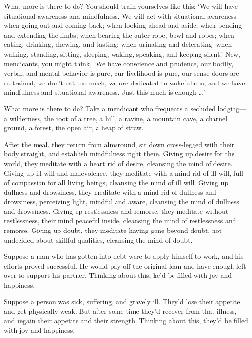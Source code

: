 \documentclass[12pt,openany]{book}%
\begin{document}
What more is there to do? You should train yourselves like this: ‘We will have situational awareness and mindfulness. We will act with situational awareness when going out and coming back; when looking ahead and aside; when bending and extending the limbs; when bearing the outer robe, bowl and robes; when eating, drinking, chewing, and tasting; when urinating and defecating; when walking, standing, sitting, sleeping, waking, speaking, and keeping silent.’ Now, mendicants, you might think, ‘We have conscience and prudence, our bodily, verbal, and mental behavior is pure, our livelihood is pure, our sense doors are restrained, we don’t eat too much, we are dedicated to wakefulness, and we have mindfulness and situational awareness. Just this much is enough …’ 

What more is there to do? Take a mendicant who frequents a secluded lodging—a wilderness, the root of a tree, a hill, a ravine, a mountain cave, a charnel ground, a forest, the open air, a heap of straw. 

After the meal, they return from almsround, sit down cross-legged with their body straight, and establish mindfulness right there. Giving up desire for the world, they meditate with a heart rid of desire, cleansing the mind of desire. Giving up ill will and malevolence, they meditate with a mind rid of ill will, full of compassion for all living beings, cleansing the mind of ill will. Giving up dullness and drowsiness, they meditate with a mind rid of dullness and drowsiness, perceiving light, mindful and aware, cleansing the mind of dullness and drowsiness. Giving up restlessness and remorse, they meditate without restlessness, their mind peaceful inside, cleansing the mind of restlessness and remorse. Giving up doubt, they meditate having gone beyond doubt, not undecided about skillful qualities, cleansing the mind of doubt. 

Suppose a man who has gotten into debt were to apply himself to work, and his efforts proved successful. He would pay off the original loan and have enough left over to support his partner. Thinking about this, he’d be filled with joy and happiness. 

Suppose a person was sick, suffering, and gravely ill. They’d lose their appetite and get physically weak. But after some time they’d recover from that illness, and regain their appetite and their strength. Thinking about this, they’d be filled with joy and happiness. 
\end{document}
